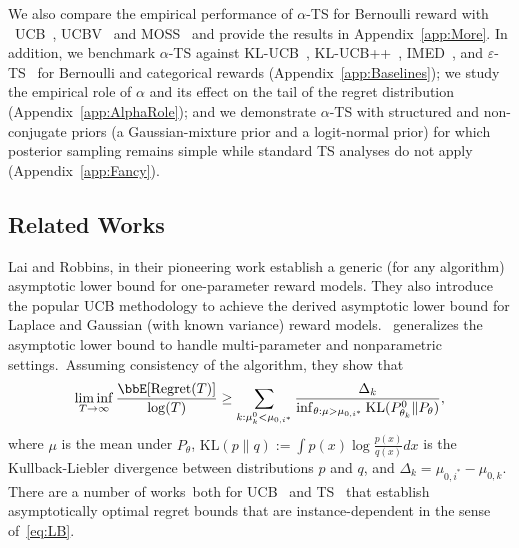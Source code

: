 \documentclass[11pt]{article}
\begin{document}
We also compare the empirical performance of $\alpha$-TS for Bernoulli reward with ~UCB~\citep{Auer2002}, UCBV~\citep{audibert2009exploration} and MOSS~\citep{audibert2009minimax} and provide the results in Appendix~\ref{app:More}. In addition, we benchmark $\alpha$-TS against KL-UCB~\citep{garivier2011kl}, KL-UCB++~\citep{menard2017minimax}, IMED~\citep{honda2015imed}, and $\varepsilon$-TS~\citep{jin2023eps} for Bernoulli and categorical rewards (Appendix~\ref{app:Baselines}); we study the empirical role of $\alpha$ and its effect on the tail of the regret distribution (Appendix~\ref{app:AlphaRole}); and we demonstrate $\alpha$-TS with structured and non-conjugate priors (a Gaussian-mixture prior and a logit-normal prior) for which posterior sampling remains simple while standard TS analyses do not apply (Appendix~\ref{app:Fancy}). 

\subsection{Related Works}
\phantom{a}
 Lai and Robbins, in their pioneering work \citep{lai1985asymptotically} establish a generic (for any algorithm) asymptotic lower bound for one-parameter reward models. They also introduce the popular UCB methodology to achieve the derived asymptotic lower bound for Laplace and Gaussian (with known variance) reward models.~\cite{burnetas1996optimal} generalizes the asymptotic lower bound to handle multi-parameter and nonparametric settings.~Assuming consistency of the algorithm, they show that
\begin{align}
   \liminf_{T\to \infty} \frac{\bbE[\text{Regret}(T)]}{\log (T)} \geq \sum_{k: \mu^0_k < \mu_{0,i^*}}  \frac{\Delta_k }{\inf_{\theta: \mu> \mu_{0,i^*}} \text{KL}(P_{\theta_k}^0\| P_{\theta} )},
   \label{eq:LB}
\end{align}
where $\mu$ is the mean under $P_{\theta}$, $\text{KL}(p\|q):=\int p(x) \log \frac{p(x)}{q(x)}dx $ is the Kullback-Liebler divergence between distributions $p$ and $q$, and $\Delta_k=\mu_{0,i^*} - \mu_{0,k}$. There are a number of works~both for UCB~\citep{Auer2002,honda2010asymptotically}  and TS~\citep{Kaufmann2012,agrawal2012analysis,honda2014optimality,Kaufmann2013} 
that establish asymptotically optimal regret bounds that are instance-dependent in the sense of~\eqref{eq:LB}.
\end{document}
